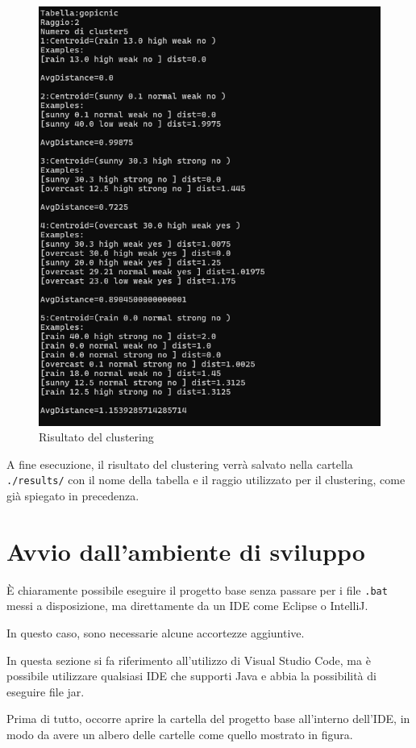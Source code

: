 \begin{figure}[h!]
    \centering
    \includegraphics[width = 0.5 \textwidth]{images/risultato atteso.png}
    \caption{Risultato del clustering}
\end{figure}

A fine esecuzione, il risultato del clustering verrà salvato nella cartella \texttt{./results/} con il nome della tabella e il raggio utilizzato per il clustering, come già spiegato in precedenza.

\section{Avvio dall'ambiente di sviluppo}

È chiaramente possibile eseguire il progetto base senza passare per i file \texttt{.bat} messi a disposizione, ma direttamente da un IDE come Eclipse o IntelliJ.

In questo caso, sono necessarie alcune accortezze aggiuntive. 

\begin{tcolorbox}[  colback=white!5!white, colframe=gray, title={Avvertenza} ]

    In questa sezione si fa riferimento all'utilizzo di Visual Studio Code, ma è possibile utilizzare qualsiasi IDE che supporti Java e abbia la possibilità di eseguire file jar.

\end{tcolorbox}

Prima di tutto, occorre aprire la cartella del progetto base all'interno dell'IDE, in modo da avere un albero delle cartelle come quello mostrato in figura.

